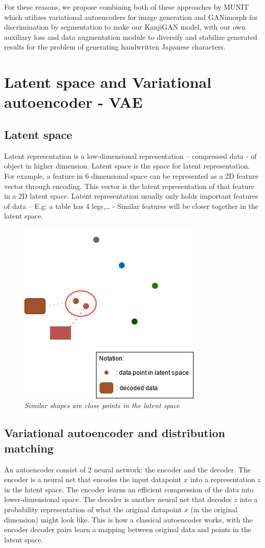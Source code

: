 \documentclass[12pt]{report}
\begin{document}
For these reasons, we propose combining both of these approaches by MUNIT\cite{munit} which utilizes variational autoencoders for image generation and GANimorph\cite{ganimorph} for discrimination by segmentation to make our KanjiGAN model, with our own auxiliary loss and data augmentation module to diversify and stabilize generated results for the problem of generating handwritten Japanese characters.

\section{Latent space and Variational autoencoder - VAE}
\subsection{Latent space}
Latent representation is a low-dimensional representation  – compressed data - of object in higher dimension. Latent space is the space for latent representation. For example, a feature in 6 dimensional space can be represented as a 2D feature vector through encoding. This vector is the latent representation of that feature in a 2D latent space.
Latent representation usually only holds important features of data –  E.g: a table has 4 legs,… - Similar features will be closer together in the latent space.
\begin{figure}[H]
	\centering
	\includegraphics[scale=0.9]{latent-space}
	\caption{\textit{Similar shapes are close points in the latent space}}
	\label{fig:latent-space}
\end{figure}

\subsection{Variational autoencoder and distribution matching}
An autoencoder consist of 2 neural network: the encoder and the decoder.
The encoder is a neural net that encodes the input datapoint $x$ into a representation $z$ in the latent space. The encoder learns an efficient compression of the data into lower-dimensional space.
The decoder is another neural net that decodes $z$ into a probability representation of what the original datapoint $x$ (in the original dimension) might look like.
This is how a classical autoencoder works, with the encoder decoder pairs learn a mapping between original data and points in the latent space.
\end{document}
